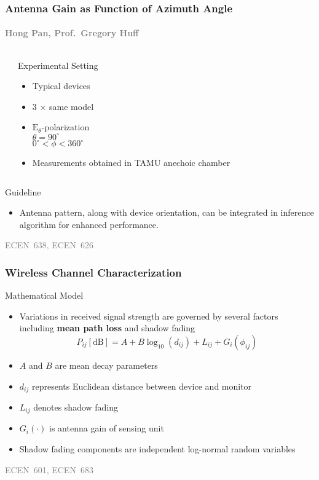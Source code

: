 \documentclass{beamer}
\begin{document}
\begin{frame}
\frametitle{Antenna Gain as Function of Azimuth Angle}
\framesubtitle{\textcolor{gray}{\scriptsize Hong Pan, Prof.~Gregory Huff}}
\begin{columns}
  \begin{center}
  \scalebox{0.70}{}
  \end{center}
\begin{block}{Experimental Setting}
  \begin{itemize}
  \item Typical devices
  \item 3 $\times$ same model
  \item $\mathrm{E}_{\theta}$-polarization\\
    $\theta = 90^{\circ}$\\
    $0^{\circ} < \phi < 360^{\circ}$
  \item Measurements obtained in TAMU anechoic chamber
  \end{itemize}
\end{block}
\end{columns}
\vfill
\begin{block}{Guideline}
  \begin{itemize}
  \item  Antenna pattern, along with device orientation, can be integrated in inference algorithm for enhanced performance.
  \end{itemize}
\end{block}
\vfill
\textcolor{gray}{\tiny ECEN~638, ECEN~626}
\end{frame}

\begin{frame}
\frametitle{Wireless Channel Characterization}
\begin{block}{Mathematical Model}
  \begin{itemize}
  \item Variations in received signal strength are governed by several factors including \textbf{mean path loss} and shadow fading
    \begin{equation*}
    P_{ij} \mathrm{[dB]}
    = A + B \log_{10} (d_{ij}) + L_{ij} + G_i(\phi_{ij})
    \end{equation*}
  \item $A$ and $B$ are mean decay parameters
  \item $d_{ij}$ represents Euclidean distance between device and monitor
  \item $L_{ij}$ denotes shadow fading
  \item $G_i (\cdot)$ is antenna gain of sensing unit
  \item Shadow fading components are independent log-normal random variables
  \end{itemize}
\end{block}
\vfill
\textcolor{gray}{\tiny ECEN~601, ECEN~683}
\end{frame}
\end{document}
